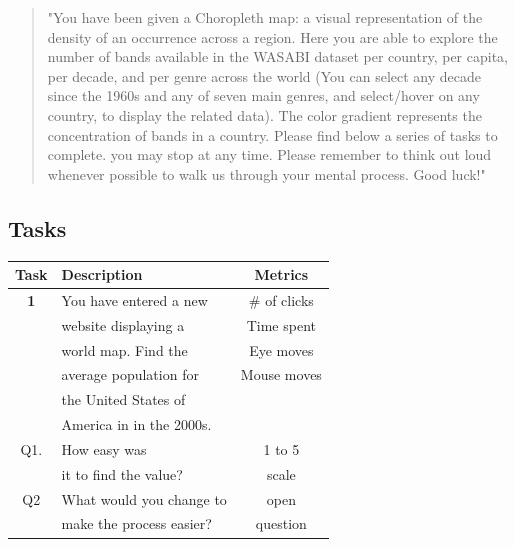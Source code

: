 \documentclass[twocolumn, letterpaper,13pt]{scrartcl}
\begin{document}
    \begin{quote}
        "You have been given a Choropleth map: a visual representation of the density of an occurrence across a region. 
        \newline\newline
        Here you are able to explore the number of bands available in the WASABI dataset per country, per capita, per decade, and per genre across the world (You can select any decade since the 1960s and any of seven main genres, and select/hover on any country, to display the related data). 
        \newline\newline
        The color gradient represents the concentration of bands in a country.
        \newline\newline
        Please find below a series of tasks to complete. you may stop at any time. Please remember to think out loud whenever possible to walk us through your mental process. Good luck!"
    \end{quote}
    
    \subsection*{Tasks}
    
    \begin{center}
    \begin{tabular} { | c | l | c | }
    \hline
     Task & Description & Metrics \\
    \hline
    \textbf{1} & You have entered a new & \# of clicks \\
    & website displaying a & Time spent\\
    & world map. Find the & Eye moves\\
    & average population for & Mouse moves\\
    & the United States of & \\
    & America in in the 2000s.& \\
    \hline
    Q1. & How easy was & 1 to 5\\
    & it to find the value? & scale \\
    \hline
    Q2 & What would you change to & open\\
    & make the process easier? & question\\
    \hline
    \end{tabular}
    \end{center}
\end{document}
